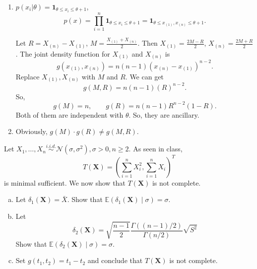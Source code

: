 \begin{solution}
    \begin{enumerate}
        \item $p(x_i|\theta)=\mathbf{1}_{\theta\leqslant x_i\leqslant \theta+1}$, 
        \[
            p(x)=\prod_{i=1}^n\mathbf{1}_{\theta\leqslant x_i\leqslant \theta+1}=\mathbf{1}_{\theta\leqslant x_{(1)}, x_{(n)}\leqslant \theta+1}. 
        \]
        
        Let $R=X_{(n)}-X_{(1)}$, $M=\frac{X_{(1)}+X_{(n)}}{2}$. Then $X_{(1)}=\frac{2M-R}{2}$, $X_{(n)}=\frac{2M+R}{2}$. The joint density function for $X_{(1)}$ and $X_{(n)}$ is 
        \[
            g(x_{(1)}, x_{(n)})=n(n-1)(x_{(n)}-x_{(1)})^{n-2}. 
        \]
        Replace $X_{(1)}, X_{(n)}$ with $M$ and $R$. We can get 
        \[
            g(M,R)=n(n-1)(R)^{n-2}. 
        \]
        So, \[
            g(M)=n, \qquad g(R)=n(n-1)R^{n-2}(1-R). 
        \]
        Both of them are independent with $\theta$. So, they are ancillary. 

        \item Obviously, $g(M)\cdot g(R)\neq g(M,R)$. 
    \end{enumerate}
    
\end{solution}

\begin{ex}
    Let \(X_{1}, \ldots, X_{n} \stackrel{i.i.d. }{\sim} \mathcal{N}\left(\sigma, \sigma^{2}\right), \sigma>0, n \geq 2\). As seen in class,
\[
T(\mathbf{X})=\left(\sum_{i=1}^{n} X_{i}^{2}, \sum_{i=1}^{n} X_{i}\right)^{T}
\]
is minimal sufficient. We now show that \(T(\mathbf{X})\) is not complete. 
    \begin{enumerate}[(a)]
        \item Let \(\delta_{1}(\mathbf{X})=\bar{X}\). Show that \(\mathbb{E}\left(\delta_{1}(\mathbf{X}) \mid \sigma\right)=\sigma\). 
        \item Let
        \[
        \delta_{2}(\mathbf{X})=\sqrt{\frac{n-1}{2}} \frac{\Gamma((n-1) / 2)}{\Gamma(n / 2)} \sqrt{S^{2}}
        \]
        Show that \(\mathbb{E}\left(\delta_{2}(\mathbf{X}) \mid \sigma\right)=\sigma\). 
        \item Set \(g\left(t_{1}, t_{2}\right)=t_{1}-t_{2}\) and conclude that \(T(\mathbf{X})\) is not complete. 
    \end{enumerate}
\end{ex}

